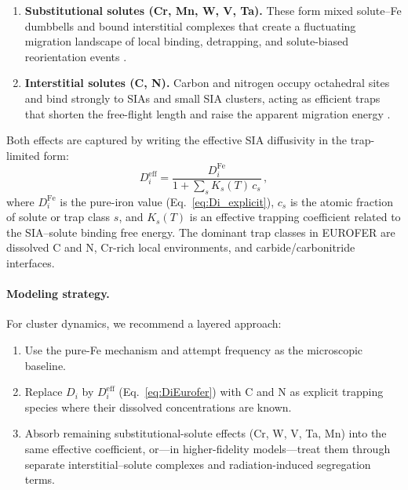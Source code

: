 \documentclass[pdflatex,sn-basic]{sn-jnl} %
\begin{document}
\begin{enumerate}
\item \textbf{Substitutional solutes (Cr, Mn, W, V, Ta).}
      These form mixed solute--Fe dumbbells and bound interstitial complexes
      that create a fluctuating migration landscape of local binding,
      detrapping, and solute-biased reorientation events
      \citep{Olsson2007, Olsson2010, Vincent2006, Messina2020}.

\item \textbf{Interstitial solutes (C, N).}
      Carbon and nitrogen occupy octahedral sites and bind strongly to SIAs
      and small SIA clusters, acting as efficient traps that shorten
      the free-flight length and raise the apparent migration energy
      \citep{Domain2004, Becquart2005, Terentyev2011, Theodorou2022}.
\end{enumerate}

Both effects are captured by writing the effective SIA diffusivity in the trap-limited form:
\begin{equation}\label{eq:DiEurofer}
    \boxed{D_i^{\mathrm{eff}}
    = \frac{D_i^{\mathrm{Fe}}}
           {1 + \displaystyle\sum_s K_s(T)\,c_s}\,,}
\end{equation}
where $D_i^{\mathrm{Fe}}$ is the pure-iron value (Eq.~\ref{eq:Di_explicit}), $c_s$ is the atomic fraction of solute or trap class $s$, and $K_s(T)$ is an effective trapping coefficient related to the SIA--solute binding free energy. The dominant trap classes in EUROFER are dissolved C and N, Cr-rich local environments, and carbide/carbonitride interfaces.

\paragraph{Modeling strategy.}
For cluster dynamics, we recommend a layered approach:
\begin{enumerate}
    \item Use the pure-Fe mechanism and attempt frequency as the microscopic baseline.
    \item Replace $D_i$ by $D_i^{\mathrm{eff}}$ (Eq.~\ref{eq:DiEurofer}) with C and N as explicit trapping species where their dissolved concentrations are known.
    \item Absorb remaining substitutional-solute effects (Cr, W, V, Ta, Mn) into the same effective coefficient, or---in higher-fidelity models---treat them through separate interstitial--solute complexes and radiation-induced segregation terms.
\end{enumerate}
\end{document}
